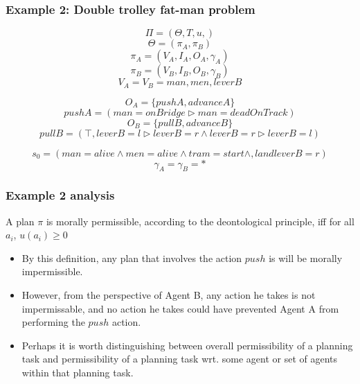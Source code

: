 \documentclass{beamer}
\begin{document}
\begin{frame}
\frametitle{Example 2: Double trolley fat-man problem}
\[
\Pi = \left( \Theta, T, u, \right)
\]
\[
\Theta=(\pi_A, \pi_B)
\]
\[
\pi_A = (V_A, I_A, O_A, \gamma_A)
\]
\[
\pi_B = (V_B, I_B, O_B, \gamma_B)
\]
\[
V_A = V_B = {man, men, leverB}
\]

\[
O_A = \{pushA, advanceA\}
\]
\[
pushA = (man=onBridge \triangleright man = deadOnTrack)
\]
\[
O_B = \{pullB, advanceB\}
\]
\[
pullB = (\top, leverB=l \triangleright leverB=r \land leverB=r \triangleright leverB=l)
\]

\[
s_0 = (man=alive \land men=alive \land tram = start \land, land leverB = r)
\]
\[
\gamma_A=\gamma_B = *
\]
\end{frame}


\begin{frame}
\frametitle{Example 2 analysis}
\begin{definition}
A plan $\pi$ is morally permissible, according to the deontological principle, iff for all $a_i$, $u(a_i) \geq 0$
\end{definition}

\begin{itemize}
\item By this definition, any plan that involves the action $push$ is will be morally impermissible.
\item However, from the perspective of Agent B, any action he takes is not impermissable, and no action he takes could have prevented Agent A from performing the $push$ action.
\item Perhaps it is worth distinguishing between overall permissibility of a planning task and permissibility of a planning task wrt. some agent or set of agents within that planning task.
\end{itemize}
\end{frame}
\end{document}
